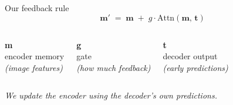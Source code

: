 \documentclass[aspectratio=169,11pt]{beamer}
\begin{document}
\begin{frame}{Our feedback rule}
    \vspace{0.6em}
    \begin{equation*}
        \mathbf{m}' \;=\; \mathbf{m} \;+\; g \cdot
        \mathrm{Attn}(\mathbf{m},\, \mathbf{t})
    \end{equation*}

    \vspace{1em}
    \begin{columns}[T, onlytextwidth]
        \centering
        {\fontsize{40}{40}\selectfont\bfseries\color{Navy}m}\\[0.4em]
        encoder memory\\
        {\small\itshape\color{Light}(image features)}

        \centering
        {\fontsize{40}{40}\selectfont\bfseries\color{orange!90!black}g}\\[0.4em]
        gate\\
        {\small\itshape\color{Light}(how much feedback)}

        \centering
        {\fontsize{40}{40}\selectfont\bfseries\color{GoodGreen}t}\\[0.4em]
        decoder output\\
        {\small\itshape\color{Light}(early predictions)}
    \end{columns}

    \vfill
    {\small\itshape\color{Light}\centering
    We update the encoder using the decoder's own predictions.\par}
\end{frame}
\end{document}
